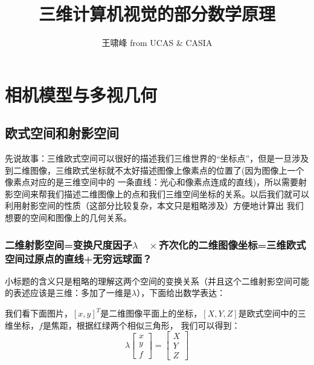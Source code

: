 \documentclass[12pt]{article}
\begin{document}
%
%

\title{三维计算机视觉的部分数学原理}
\author{王啸峰 from UCAS \& CASIA} %

\maketitle

\section{相机模型与多视几何}
\subsection{欧式空间和射影空间}
先说故事：三维欧式空间可以很好的描述我们三维世界的“坐标点”，但是一旦涉及到二维图像，三维欧式坐标就不太好描述图像上像素点的位置了(因为图像上一个像素点对应的是三维空间中的
一条直线：光心和像素点连成的直线)，所以需要射影空间来帮我们描述二维图像上的点和我们三维空间坐标的关系。以后我们就可以利用射影空间的性质（这部分比较复杂，本文只是粗略涉及）方便地计算出
我们想要的空间和图像上的几何关系。

\subsubsection{二维射影空间=变换尺度因子$\lambda \quad \times$齐次化的二维图像坐标=三维欧式空间过原点的直线+无穷远球面？}
小标题的含义只是粗略的理解这两个空间的变换关系（并且这个二维射影空间可能的表述应该是三维：多加了一维是$\lambda$），下面给出数学表达：

我们看下面图片，$[x,y]^T$是二维图像平面上的坐标，$[X,Y,Z]$是欧式空间中的三维坐标，$f$是焦距，根据红绿两个相似三角形，
我们可以得到：
\begin{equation}
    \lambda\left[\begin{array}{l}
        x \\
        y \\
        f
        \end{array}\right]=\left[\begin{array}{l}
        X \\
        Y \\
        Z
        \end{array}\right]
\end{equation}
\end{document}
